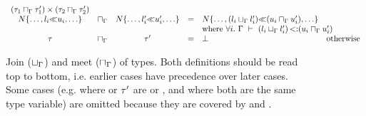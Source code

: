 \begin{figure}
{\begin{minipage}{\ruleswidth}
\[\begin{array}{ccccll}
        \typair{(\tymeetdflt{\ty_1}{\ty'_1})}{(\tymeetdflt{\ty_2}{\ty'_2})} &  \\
    \tyinv\iname{\ldots,\rexvarbound{\tylb_i}{\tyub_i},\ldots} 
        &\sqcap_{\AEnv}& \tyinv\iname{\ldots,\rexvarbound{\tylb'_i}{\tyub'_i},\ldots} &=& 
        \tyinv\iname{\ldots,\rexvarbound{(\tyjoindflt{\tylb_i}{\tylb'_i})}
            {(\tymeetdflt{\tyub_i}{\tyub'_i})},\ldots} &  \\
    & & & & \multicolumn{2}{l}{\text{where } \forall i.\ 
        \subtydflt{(\tyjoindflt{\tylb_i}{\tylb'_i})}
        {(\tymeetdflt{\tyub_i}{\tyub'_i})} } \\
    \ty &\sqcap_{\AEnv}& \ty' &=& \tybot & \text{otherwise} \\
\end{array}
\]
\end{minipage}}
\caption{Join ($\sqcup_{\Gamma}$) and meet ($\sqcap_{\Gamma}$) of types.
Both definitions should be read top to bottom, i.e. earlier cases have
precedence over later cases.
Some cases (e.g. where \ty or $\tau'$ are \tybot or \tyany, 
and where both are the same type variable)
are omitted because they are covered by  and 
\subtydflt{\ty'}{\ty}.}\label{fig:ty-join-meet}
\end{figure}

